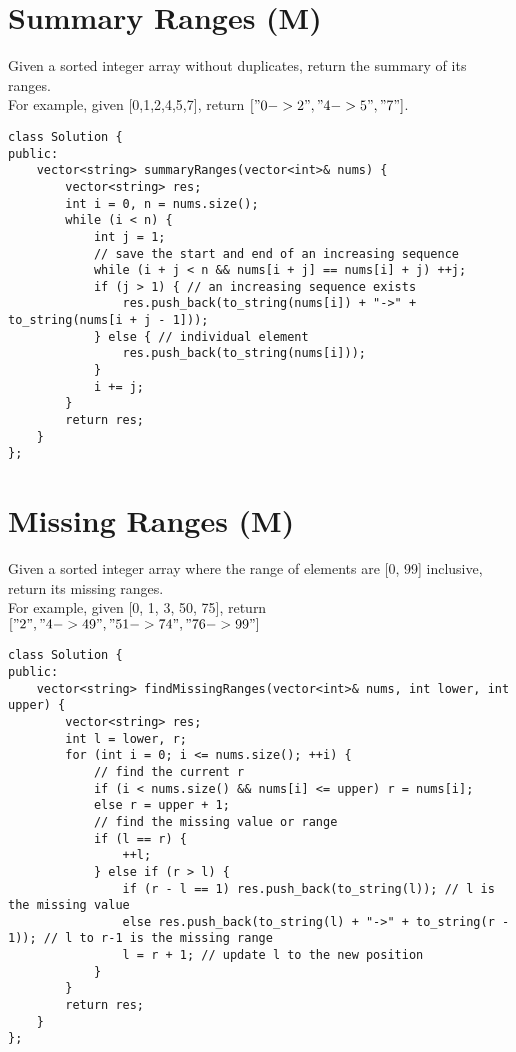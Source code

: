 \section{Summary Ranges (M)}
Given a sorted integer array without duplicates, return the summary of its ranges.\\

For example, given [0,1,2,4,5,7], return $["0->2","4->5","7"]$.\\

\begin{lstlisting}
class Solution {
public:
    vector<string> summaryRanges(vector<int>& nums) {
        vector<string> res;
        int i = 0, n = nums.size();
        while (i < n) {
            int j = 1;
            // save the start and end of an increasing sequence
            while (i + j < n && nums[i + j] == nums[i] + j) ++j;
            if (j > 1) { // an increasing sequence exists
                res.push_back(to_string(nums[i]) + "->" + to_string(nums[i + j - 1]));
            } else { // individual element
                res.push_back(to_string(nums[i]));
            }
            i += j;
        }
        return res;
    }
};
\end{lstlisting}


\section{Missing Ranges (M)}
Given a sorted integer array where the range of elements are [0, 99] inclusive, return its missing ranges.\\

For example, given [0, 1, 3, 50, 75], return $["2", "4->49", "51->74", "76->99"]$ \\

\begin{lstlisting}
class Solution {
public:
    vector<string> findMissingRanges(vector<int>& nums, int lower, int upper) {
        vector<string> res;
        int l = lower, r;
        for (int i = 0; i <= nums.size(); ++i) {
            // find the current r
            if (i < nums.size() && nums[i] <= upper) r = nums[i];
            else r = upper + 1;
            // find the missing value or range
            if (l == r) {
                ++l;
            } else if (r > l) {
                if (r - l == 1) res.push_back(to_string(l)); // l is the missing value
                else res.push_back(to_string(l) + "->" + to_string(r - 1)); // l to r-1 is the missing range
                l = r + 1; // update l to the new position
            }
        }
        return res;
    }
};
\end{lstlisting}


